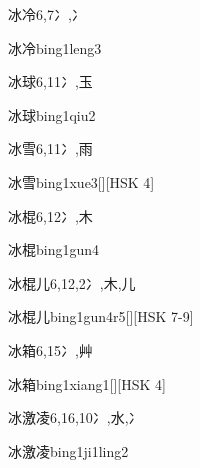 \begin{Entry}{冰冷}{6,7}{⼎,⼎}
  \begin{Phonetics}{冰冷}{bing1leng3}
  \end{Phonetics}
\end{Entry}

\begin{Entry}{冰球}{6,11}{⼎,⽟}
  \begin{Phonetics}{冰球}{bing1qiu2}
  \end{Phonetics}
\end{Entry}

\begin{Entry}{冰雪}{6,11}{⼎,⾬}
  \begin{Phonetics}{冰雪}{bing1xue3}[][HSK 4]
  \end{Phonetics}
\end{Entry}

\begin{Entry}{冰棍}{6,12}{⼎,⽊}
  \begin{Phonetics}{冰棍}{bing1gun4}
  \end{Phonetics}
\end{Entry}

\begin{Entry}{冰棍儿}{6,12,2}{⼎,⽊,⼉}
  \begin{Phonetics}{冰棍儿}{bing1gun4r5}[][HSK 7-9]
  \end{Phonetics}
\end{Entry}

\begin{Entry}{冰箱}{6,15}{⼎,⾋}
  \begin{Phonetics}{冰箱}{bing1xiang1}[][HSK 4]
  \end{Phonetics}
\end{Entry}

\begin{Entry}{冰激凌}{6,16,10}{⼎,⽔,⼎}
  \begin{Phonetics}{冰激凌}{bing1ji1ling2}
  \end{Phonetics}
\end{Entry}

